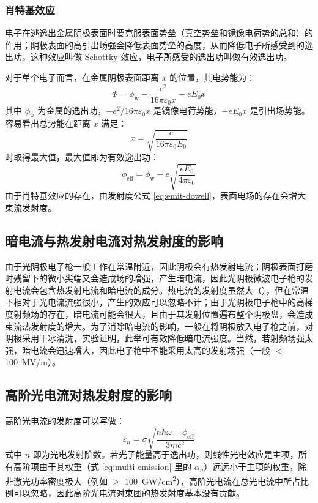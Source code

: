 \subsubsection{肖特基效应}
	电子在逃逸出金属阴极表面时要克服表面势垒（真空势垒和镜像电荷势的总和）的作用；阴极表面的高引出场强会降低表面势垒的高度，从而降低电子所感受到的逸出功，这种效应叫做 Schottky 效应，电子所感受的逸出功叫做有效逸出功。

	对于单个电子而言，在金属阴极表面距离 $x$ 的位置，其电势能为：
	\[
	\Phi = \phi_{\mathrm{w}} - \frac{e^2}{16\pi\varepsilon_0x} - eE_0x
	\]
	其中 $\phi_{\mathrm{w}}$ 为金属的逸出功，$-e^2/16\pi\varepsilon_0x$ 是镜像电荷势能，$- eE_0x$ 是引出场势能。
	容易看出总势能在距离 $x$ 满足：
	\[
	x = \sqrt{\frac{e}{16\pi\varepsilon_0E_0}}
	\]
	时取得最大值，最大值即为有效逸出功：
	\begin{equation}
	\phi_{\mathrm{eff}} = \phi_{\mathrm{w}} - e\sqrt{\frac{eE_0}{4\pi\varepsilon_0}}
	\end{equation}
由于肖特基效应的存在，由发射度公式 \ref{eq:emit-dowell}，表面电场的存在会增大束流发射度。

\subsection{暗电流与热发射电流对热发射度的影响}
由于光阴极电子枪一般工作在常温附近，因此阴极会有热发射电流；阴极表面打磨时残留下的微小尖端又会造成场的增强，产生暗电流，因此光阴极微波电子枪的发射电流会包含热发射电流和暗电流的成分。热电流的发射度虽然大（），但在常温下相对于光电流流强很小，产生的效应可以忽略不计；由于光阴极电子枪中的高梯度射频场的存在，暗电流可能会很大，且由于其发射位置遍布整个阴极盘，会造成束流热发射度的增大。为了消除暗电流的影响，一般在将阴极放入电子枪之前，对阴极采用干冰清洗，实验证明，此举可有效降低暗电流强度。当然，若射频场强太强，暗电流会迅速增大，因此电子枪中不能采用太高的发射场强（一般 $<$ \SI{100}{MV/m}）。

\subsection{高阶光电流对热发射度的影响}
高阶光电流的发射度可以写做：
\begin{equation}
	\varepsilon_{n} =\sigma\sqrt{\dfrac{n\hbar\omega-\phi_{\mathrm{eff}}}{3mc^2}}
\end{equation}
式中 $n$ 即为光电发射阶数。若光子能量高于逸出功，则线性光电效应是主项，所有高阶项由于其权重（式 \ref{eq:multi-emission} 里的 $\alpha_n$）远远小于主项的权重，除非激光功率密度极大（例如 $>$ \SI{100}{GW/cm^2}），高阶光电流在总光电流中所占比例可以忽略，因此高阶光电流对束团的热发射度基本没有贡献。

